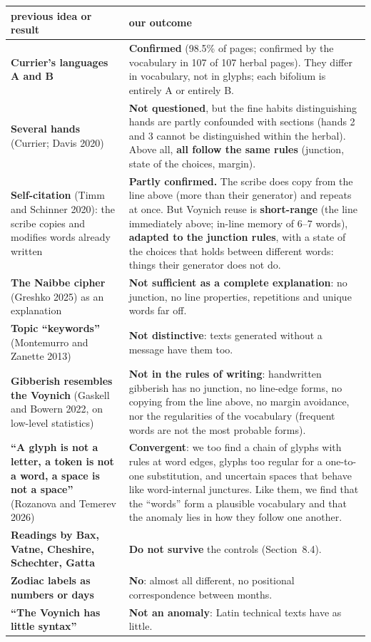 \begin{center}\footnotesize
\begin{tabularx}{\linewidth}{>{\raggedright\arraybackslash}p{5.2cm}Y}
\toprule
previous idea or result & our outcome \\
\midrule
\textbf{Currier's languages A and B} & \textbf{Confirmed} (98.5\% of pages; confirmed by the vocabulary in 107 of 107 herbal
pages). They differ in vocabulary, not in glyphs; each bifolium is entirely A or entirely B. \\
\textbf{Several hands} (Currier; Davis 2020) & \textbf{Not questioned}, but the fine habits distinguishing hands are partly
confounded with sections (hands 2 and 3 cannot be distinguished within the herbal). Above all, \textbf{all follow the same
rules} (junction, state of the choices, margin). \\
\textbf{Self-citation} (Timm and Schinner 2020): the scribe copies and modifies words already written & \textbf{Partly
confirmed.} The scribe does copy from the line above (more than their generator) and repeats at once. But Voynich reuse is
\textbf{short-range} (the line immediately above; in-line memory of 6--7 words), \textbf{adapted to the junction rules},
with a state of the choices that holds between different words: things their generator does not do. \\
\textbf{The Naibbe cipher} (Greshko 2025) as an explanation & \textbf{Not sufficient as a complete explanation}: no
junction, no line properties, repetitions and unique words far off. \\
\textbf{Topic ``keywords''} (Montemurro and Zanette 2013) & \textbf{Not distinctive}: texts generated without a message have
them too. \\
\textbf{Gibberish resembles the Voynich} (Gaskell and Bowern 2022, on low-level statistics) & \textbf{Not in the rules of
writing}: handwritten gibberish has no junction, no line-edge forms, no copying from the line above, no margin
avoidance, nor the regularities of the vocabulary (frequent words are not the most probable forms). \\
\textbf{``A glyph is not a letter, a token is not a word, a space is not a space''} (Rozanova and Temerev 2026) &
\textbf{Convergent}: we too find a chain of glyphs with rules at word edges, glyphs too regular for a one-to-one
substitution, and uncertain spaces that behave like word-internal junctures. Like them, we find that the ``words'' form a
plausible vocabulary and that the anomaly lies in how they follow one another. \\
\textbf{Readings by Bax, Vatne, Cheshire, Schechter, Gatta} & \textbf{Do not survive} the controls (Section~8.4). \\
\textbf{Zodiac labels as numbers or days} & \textbf{No}: almost all different, no positional correspondence between
months. \\
\textbf{``The Voynich has little syntax''} & \textbf{Not an anomaly}: Latin technical texts have as little. \\
\bottomrule
\end{tabularx}
\end{center}
